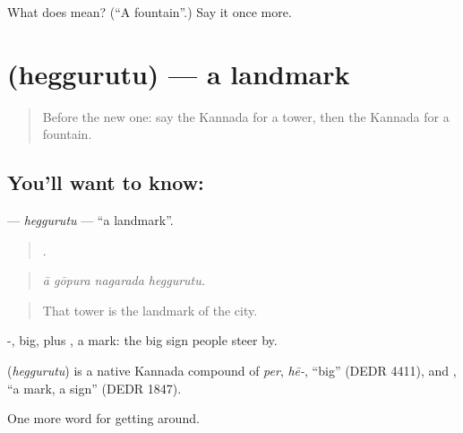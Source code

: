 \begin{tcolorbox}[breakable,colback=teal!4,colframe=teal!35!black,title={Before you move on}]
What does  mean? (\textquotedblleft{}A fountain\textquotedblright{}.) Say it once more.
\end{tcolorbox}
\section[\texorpdfstring{\kn{ಹೆಗ್ಗುರುತು} (heggurutu)}{ಹೆಗ್ಗುರುತು (heggurutu)}]{ (heggurutu) — a landmark}

\label{lesson:KA-C456-heggurutu}



\begin{quote}
Before the new one: say the Kannada for a tower, then the Kannada for a fountain.
\end{quote}

\subsection*{You'll want to know: }
\textbf{} — \emph{heggurutu} — \textquotedblleft{}a landmark\textquotedblright{}.

\begin{quote}
   .
\end{quote}

\begin{quote}
\emph{ā gōpura nagarada heggurutu.}
\end{quote}

\begin{quote}
That tower is the landmark of the city.
\end{quote}

-, big, plus , a mark: the big sign people steer by.

\begin{cousinweb}
\textbf{} (\emph{heggurutu}) is a native Kannada compound of \emph{per}, \emph{hē-}, \textquotedblleft{}big\textquotedblright{} (DEDR 4411), and , \textquotedblleft{}a mark, a sign\textquotedblright{} (DEDR 1847).
\end{cousinweb}

\begin{grammarlens}[title={What you've built}]
One more word for getting around.
\end{grammarlens}

